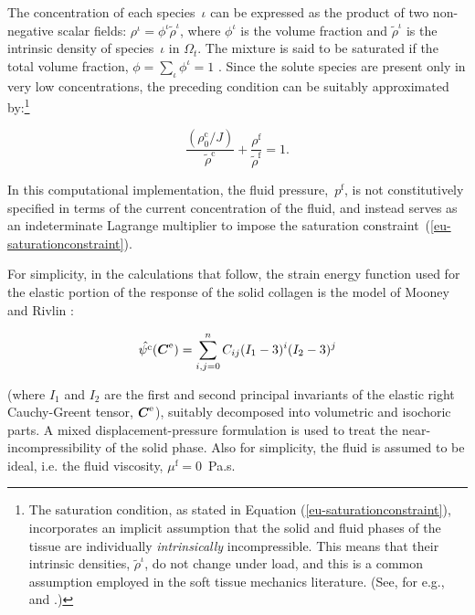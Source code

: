 The concentration of each species~$\iota$ can be expressed as the
product of two non-negative scalar fields: $\rho^\iota = \phi^\iota
\tilde{\rho}^\iota$, where $\phi^\iota$ is the volume fraction and
$\tilde{\rho}^\iota$ is the intrinsic density of species~$\iota$ in
$\Omega_{t}$. The mixture is said to be saturated if the total volume
fraction, \mbox{$\phi = \sum\limits_{\iota}\phi^\iota = 1$}
\citep{passmanetal}. Since the solute species are present only in very
low concentrations, the preceding condition can be suitably
approximated by:\footnote{The saturation condition, as stated in
  Equation (\ref{eu-saturationconstraint}), incorporates an implicit
  assumption that the solid and fluid phases of the tissue are
  individually {\em intrinsically} incompressible. This means that
  their intrinsic densities, $\tilde{\rho}^\iota$, do not change under
  load, and this is a common assumption employed in the soft tissue
  mechanics literature. (See, for e.g., \citet{mowetal1980} and
  \citet{ateshian07}.)}

\begin{equation}
\frac{\left(\rho_{0}^{\mathrm{c}}/J\right)}
     {\tilde{\rho}^{\mathrm{c}}} +
     \frac{\rho^{\mathrm{f}}}{\tilde{\rho}^{\mathrm{f}}} = 1.
\label{eu-saturationconstraint}
\end{equation}

\noindent In this computational implementation, the fluid
pressure,~$p^{\mathrm{f}}$, is not constitutively specified in terms
of the current concentration of the fluid, and instead serves as an
indeterminate Lagrange multiplier to impose the saturation
constraint~(\ref{eu-saturationconstraint}).

For simplicity, in the calculations that follow, the strain energy
function used for the elastic portion of the response of the solid
collagen is the model of Mooney and Rivlin \citep{mooney1940}:

\begin{equation}
\hat{\psi^{\mathrm{c}}} (\mbox{\boldmath$ C$}^{\mathrm{e}}) = \sum\limits_{i,j=0}^{n}
C_{ij} (I_{1}-3)^{i} (I_{2}-3)^{j}
\label{mooney-rivlin-model}
\end{equation}

\noindent (where $I_{1}$ and $I_{2}$ are the first and second
principal invariants of the elastic right Cauchy-Greent tensor,
$\mbox{\boldmath$ C$}^{\mathrm{e}}$), suitably decomposed into volumetric and isochoric
parts. A mixed displacement-pressure \citep{ZienkTay:89} formulation
is used to treat the near-incompressibility of the solid phase. Also
for simplicity, the fluid is assumed to be ideal, i.e. the fluid
viscosity, $\mu^{\mathrm{f}}=0$~Pa.s.

